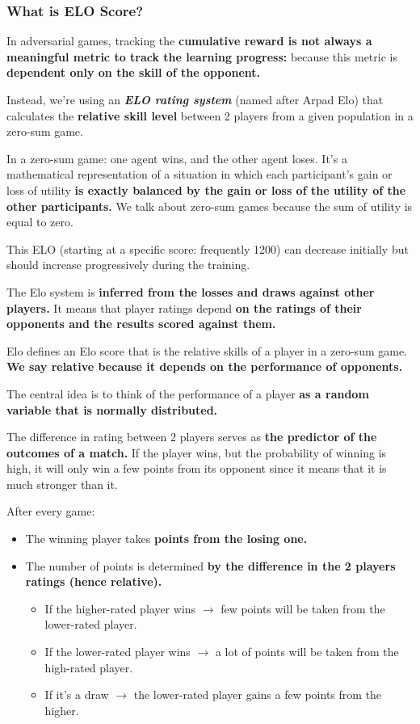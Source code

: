 \documentclass[11pt,a4paper]{article}
\begin{document}
\subsubsection{What is ELO Score?}\label{what-is-elo-score}

In adversarial games, tracking the \textbf{cumulative reward is not always a meaningful metric to track the learning progress:} because this metric is \textbf{dependent only on the skill of the opponent.}

Instead, we're using an \textbf{\emph{ELO rating system}} (named after Arpad Elo) that calculates the \textbf{relative skill level} between 2 players from a given population in a zero-sum game.

In a zero-sum game: one agent wins, and the other agent loses. It's a mathematical representation of a situation in which each participant's gain or loss of utility \textbf{is exactly balanced by the gain or loss of the utility of the other participants.} We talk about zero-sum games because the sum of utility is equal to zero.

This ELO (starting at a specific score: frequently 1200) can decrease initially but should increase progressively during the training.

The Elo system is \textbf{inferred from the losses and draws against other players.} It means that player ratings depend \textbf{on the ratings of their opponents and the results scored against them.}

Elo defines an Elo score that is the relative skills of a player in a zero-sum game. \textbf{We say relative because it depends on the performance of opponents.}

The central idea is to think of the performance of a player \textbf{as a random variable that is normally distributed.}

The difference in rating between 2 players serves as \textbf{the predictor of the outcomes of a match.} If the player wins, but the probability of winning is high, it will only win a few points from its opponent since it means that it is much stronger than it.

After every game:

\begin{itemize}
\tightlist
\item
  The winning player takes \textbf{points from the losing one.}
\item
  The number of points is determined \textbf{by the difference in the 2 players ratings (hence relative).}

  \begin{itemize}
  \tightlist
  \item
    If the higher-rated player wins $\rightarrow$ few points will be taken from the lower-rated player.
  \item
    If the lower-rated player wins $\rightarrow$ a lot of points will be taken from the high-rated player.
  \item
    If it's a draw $\rightarrow$ the lower-rated player gains a few points from the higher.
  \end{itemize}
\end{itemize}
\end{document}
